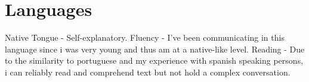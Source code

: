 \section{Languages}
{Native Tongue - Self-explanatory.}
{Fluency - I've been communicating in this language since i was very young and thus am at a native-like level.}
{Reading - Due to the similarity to portuguese and my experience with spanish speaking persons, i can reliably read and comprehend text but not hold a complex conversation.}
